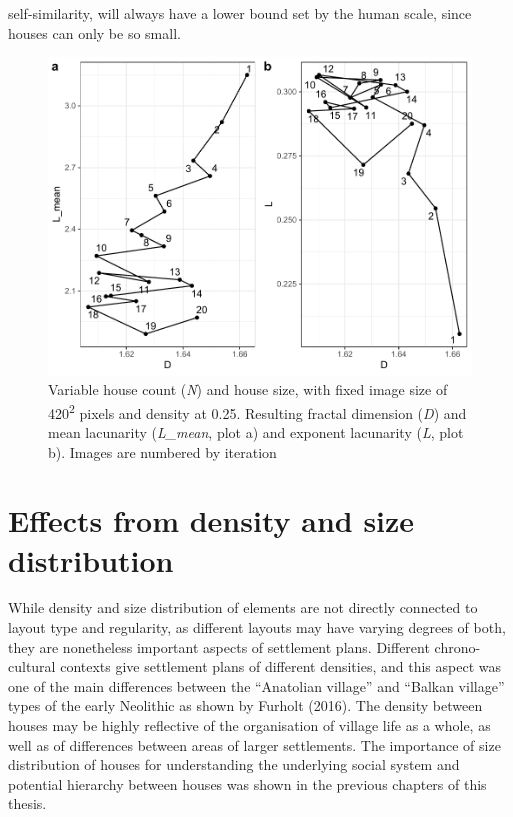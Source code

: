 \documentclass[
  12pt,
  a4paper, twoside]{book}
\begin{document}
self-similarity, will always have a lower bound set by the human scale, since houses can only be so small.



\begin{figure}

{\centering \includegraphics[width=0.9\linewidth]{bookdown-demo_files/figure-latex/08-N-HS-1} 

}

\caption[D and L estimates, variable element count and element size (resolution), fixed image size]{Variable house count (\emph{N}) and house size, with fixed image size of 420\textsuperscript{2} pixels and density at 0.25. Resulting fractal dimension (\emph{D}) and mean lacunarity (\emph{L\_mean}, plot a) and exponent lacunarity (\emph{L}, plot b). Images are numbered by iteration}\label{fig:08-N-HS}
\end{figure}

\FloatBarrier

\hypertarget{effects-from-density-and-size-distribution}{%
\section{Effects from density and size distribution}\label{effects-from-density-and-size-distribution}}

While density and size distribution of elements are not directly connected to layout type and regularity, as different layouts may have varying degrees of both, they are nonetheless important aspects of settlement plans. Different chrono-cultural contexts give settlement plans of different densities, and this aspect was one of the main differences between the ``Anatolian village'' and ``Balkan village'' types of the early Neolithic as shown by Furholt (2016). The density between houses may be highly reflective of the organisation of village life as a whole, as well as of differences between areas of larger settlements. The importance of size distribution of houses for understanding the underlying social system and potential hierarchy between houses was shown in the previous chapters of this thesis.
\end{document}
